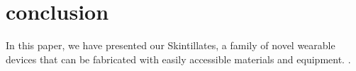 \documentclass{sigchi}
\begin{document}
\section {conclusion}
In this paper, we have presented our Skintillates, a family of novel wearable devices that can be fabricated with easily accessible materials and equipment. 
 \cite{Kim:2015ii}.





%
%
%
%
%
\balance



\end{document}
